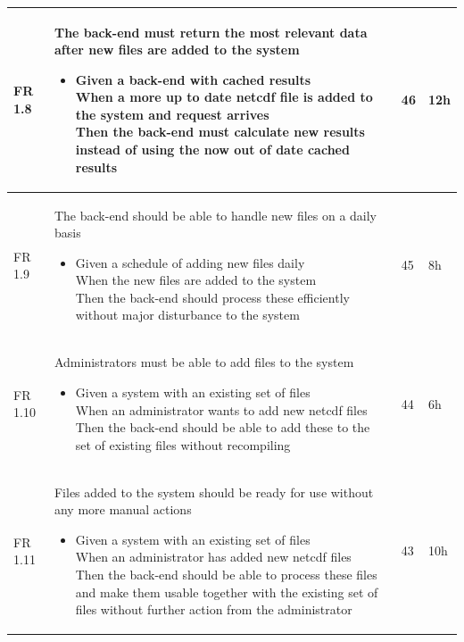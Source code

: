 \documentclass[11pt,a4paper,titlepage,oneside]{report}
\begin{document}
\begin{longtable}{p{1.4cm} p{7.8cm} p{1cm} p{1cm} }
  FR 1.8 & The \gls{back-end} must return the most relevant data after new files are added to the system
  \begin{itemize}
  \item \parbox[t]{6.8cm}{
        Given a \gls{back-end} with cached results \\
        When a more up to date \gls{netcdf} file is added to the system and request arrives \\
        Then the \gls{back-end} must calculate new results instead of using the now out of date cached results}
  \end{itemize}
  & 46 & 12h \\ \hline

  FR 1.9 & The \gls{back-end} should be able to handle new files on a daily basis
  \begin{itemize}
  \item \parbox[t]{6.8cm}{
        Given a schedule of adding new files daily \\
        When the new files are added to the system \\
        Then the \gls{back-end} should process these efficiently without major disturbance to the system}
  \end{itemize}
  & 45 & 8h \\ \hline

  FR 1.10 & Administrators must be able to add files to the system
  \begin{itemize}
  \item \parbox[t]{6.8cm}{
        Given a system with an existing set of files \\
        When an administrator wants to add new \gls{netcdf} files \\
        Then the \gls{back-end} should be able to add these to the set of existing files without recompiling}
  \end{itemize}
  & 44 & 6h \\ \hline

  FR 1.11 & Files added to the system should be ready for use without any more manual actions
  \begin{itemize}
  \item \parbox[t]{6.8cm}{
        Given a system with an existing set of files \\
        When an administrator has added new \gls{netcdf} files \\
        Then the \gls{back-end} should be able to process these files and make them usable together with the existing set of files without further action from the administrator}
  \end{itemize}
  & 43 & 10h \\ \hline


\end{longtable}
\end{document}
